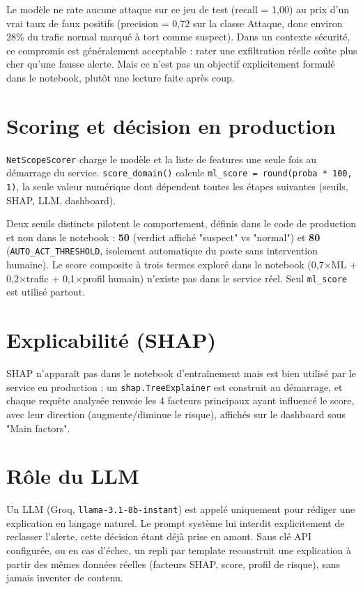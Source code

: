 \documentclass[12pt,a4paper]{report}
\begin{document}
Le modèle ne rate aucune attaque sur ce jeu de test (recall = 1,00) au prix d'un vrai taux de faux positifs (precision = 0,72 sur la classe Attaque, donc environ 28\% du trafic normal marqué à tort comme suspect). Dans un contexte sécurité, ce compromis est généralement acceptable : rater une exfiltration réelle coûte plus cher qu'une fausse alerte. Mais ce n'est pas un objectif explicitement formulé dans le notebook, plutôt une lecture faite après coup.

\section{Scoring et décision en production}

\texttt{NetScopeScorer} charge le modèle et la liste de features une seule fois au démarrage du service. \texttt{score\_domain()} calcule \texttt{ml\_score = round(proba * 100, 1)}, la seule valeur numérique dont dépendent toutes les étapes suivantes (seuils, SHAP, LLM, dashboard).

Deux seuils distincts pilotent le comportement, définis dans le code de production et non dans le notebook : \textbf{50} (verdict affiché "suspect" vs "normal") et \textbf{80} (\texttt{AUTO\_ACT\_THRESHOLD}, isolement automatique du poste sans intervention humaine). Le score composite à trois termes exploré dans le notebook (0,7×ML + 0,2×trafic + 0,1×profil humain) n'existe pas dans le service réel. Seul \texttt{ml\_score} est utilisé partout.

\section{Explicabilité (SHAP)}

SHAP n'apparaît pas dans le notebook d'entraînement mais est bien utilisé par le service en production : un \texttt{shap.TreeExplainer} est construit au démarrage, et chaque requête analysée renvoie les 4 facteurs principaux ayant influencé le score, avec leur direction (augmente/diminue le risque), affichés sur le dashboard sous "Main factors".

\section{Rôle du LLM}

Un LLM (Groq, \texttt{llama-3.1-8b-instant}) est appelé uniquement pour rédiger une explication en langage naturel. Le prompt système lui interdit explicitement de reclasser l'alerte, cette décision étant déjà prise en amont. Sans clé API configurée, ou en cas d'échec, un repli par template reconstruit une explication à partir des mêmes données réelles (facteurs SHAP, score, profil de risque), sans jamais inventer de contenu.
\end{document}
